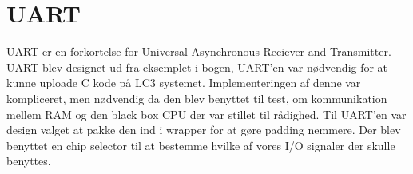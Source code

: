 \section{UART}
UART er en forkortelse for Universal Asynchronous Reciever and Transmitter. UART blev designet ud fra eksemplet i bogen, UART'en var nødvendig for at kunne uploade C kode på LC3 systemet. Implementeringen af denne var kompliceret, men nødvendig da den blev benyttet til test, om kommunikation mellem RAM og den black box CPU der var stillet til rådighed. Til UART'en var design valget at pakke den ind i wrapper for at gøre padding nemmere. Der blev benyttet en chip selector til at bestemme hvilke af vores I/O signaler der skulle benyttes.
